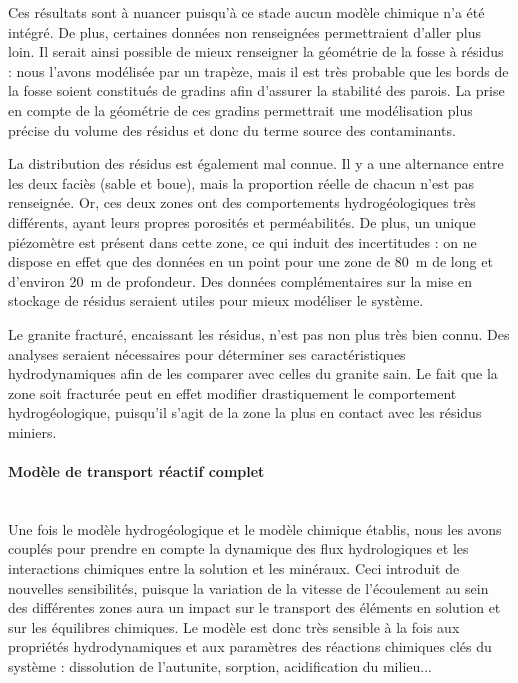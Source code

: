 \documentclass{article}
\begin{document}
Ces résultats sont à nuancer puisqu’à ce stade aucun modèle chimique n’a été intégré. De plus, certaines données non renseignées permettraient d’aller plus loin. Il serait ainsi possible de mieux renseigner la géométrie de la fosse à résidus : nous l’avons modélisée par un trapèze, mais il est très probable que les bords de la fosse soient constitués de gradins afin d’assurer la stabilité des parois. La prise en compte de la géométrie de ces gradins permettrait une modélisation plus précise du volume des résidus et donc du terme source des contaminants.

La distribution des résidus est également mal connue. Il y a une alternance entre les deux faciès (sable et boue), mais la proportion réelle de chacun n’est pas renseignée. Or, ces deux zones ont des comportements hydrogéologiques très différents, ayant leurs propres porosités et perméabilités. De plus, un unique piézomètre est présent dans cette zone, ce qui induit des incertitudes : on ne dispose en effet que des données en un point pour une zone de 80~m de long et d’environ 20~m de profondeur. Des données complémentaires sur la mise en stockage de résidus seraient utiles pour mieux modéliser le système.

Le granite fracturé, encaissant les résidus, n’est pas non plus très bien connu. Des analyses seraient nécessaires pour déterminer ses caractéristiques hydrodynamiques afin de les comparer avec celles du granite sain. Le fait que la zone soit fracturée peut en effet modifier drastiquement le comportement hydrogéologique, puisqu’il s’agit de la zone la plus en contact avec les résidus miniers.

\paragraph{Modèle de transport réactif complet \\ \\}
Une fois le modèle hydrogéologique et le modèle chimique établis, nous les avons couplés pour prendre en compte la dynamique des flux hydrologiques et les interactions chimiques entre la solution et les minéraux. Ceci introduit de nouvelles sensibilités, puisque la variation de la vitesse de l'écoulement au sein des différentes zones aura un impact sur le transport des éléments en solution et sur les équilibres chimiques. Le modèle est donc très sensible à la fois aux propriétés hydrodynamiques et aux paramètres des réactions chimiques clés du système : dissolution de l'autunite, sorption, acidification du milieu...
\end{document}
